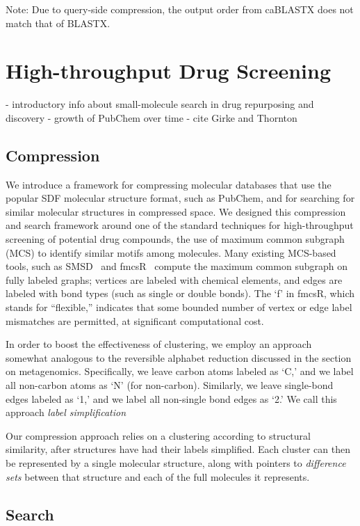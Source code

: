 \documentclass{amsbook}
\theoremstyle{definition}
\theoremstyle{remark}
\numberwithin{equation}{section}
\begin{document}
Note: Due to query-side compression, the output order from caBLASTX does not
match that of BLASTX.

\section*{High-throughput Drug Screening}

- introductory info about small-molecule search in drug repurposing and discovery
- growth of PubChem over time
- cite Girke and Thornton

\subsection*{Compression}

We introduce a framework for compressing molecular databases that use the 
popular SDF molecular structure format, such as PubChem, and for searching for 
similar molecular structures in compressed space.
We designed this compression and search framework around one of the standard 
techniques for high-throughput screening of potential drug compounds, the use 
of maximum common subgraph (MCS) to identify similar motifs among molecules.
Many existing MCS-based tools, such as SMSD~\cite{thornton} and 
fmcsR~\cite{girke} compute the maximum common subgraph on fully labeled graphs; 
vertices are labeled with chemical elements, and edges are labeled with bond 
types (such as single or double bonds).
The `f' in fmcsR, which stands for ``flexible,'' indicates that some bounded 
number of vertex or edge label mismatches are permitted, at significant 
computational cost.

In order to boost the effectiveness of clustering, we employ an approach
somewhat analogous to the reversible alphabet reduction discussed in the section
on metagenomics.
Specifically, we leave carbon atoms labeled as `C,' and we label all non-carbon
atoms as `N' (for non-carbon).
Similarly, we leave single-bond edges labeled as `1,' and we label all 
non-single bond edges as `2.'
We call this approach \emph{label simplification}

Our compression approach relies on a clustering according to structural 
similarity, after structures have had their labels simplified.
Each cluster can then be represented by a single molecular structure, along 
with pointers to \emph{difference sets} between that structure and each of the 
full molecules it represents.



\subsection*{Search}
\end{document}
